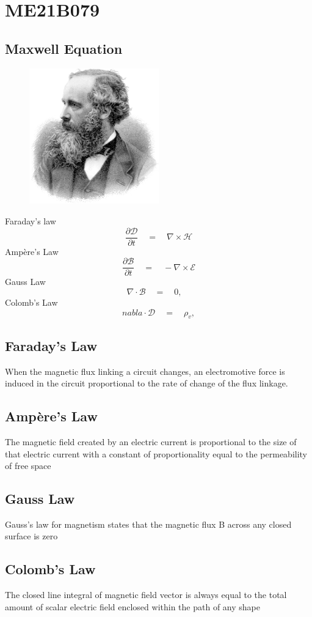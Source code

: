 \section{ME21B079}
\subsection{Maxwell Equation}
\begin{figure}[h]
\centering\includegraphics[width=0.5\textwidth]{maxwell}
\end{figure}
Faraday's law
$$ \frac{\partial\mathcal{D}}{\partial t} \quad  = \quad \nabla\times\mathcal{H}$$
Ampère's Law
$$ \frac{\partial\mathcal{B}}{\partial t} \quad  = \quad -\nabla\times\mathcal{E}$$
Gauss Law
$$ \nabla\cdot\mathcal{B}\quad  = \quad 0, \quad$$
Colomb's Law
$$ nabla\cdot\mathcal{D}\quad  = \quad \rho_{v} ,$$

\subsection{Faraday's Law}
When the magnetic flux linking a circuit changes, an electromotive force is induced in the circuit proportional to the rate of change of the flux linkage.
\subsection{Ampère's Law}
The magnetic field created by an electric current is proportional to the size of that electric current with a constant of proportionality equal to the permeability of free space
\subsection{Gauss Law}
Gauss's law for magnetism states that the magnetic flux B across any closed surface is zero
\subsection{Colomb's Law}
The closed line integral of magnetic field vector is always equal to the total amount of scalar electric field enclosed within the path of any shape
